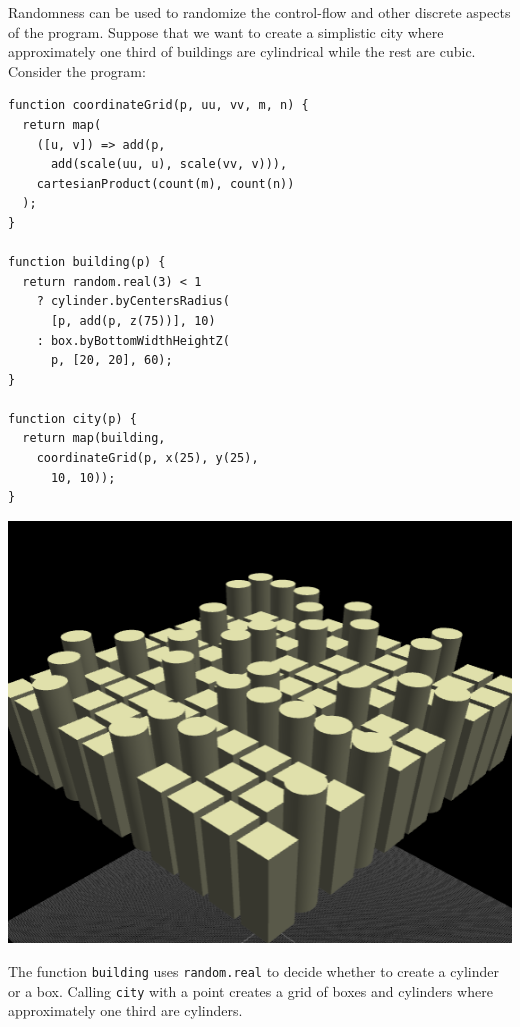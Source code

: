 Randomness can be used to randomize the control-flow and other discrete aspects of the program.
Suppose that we want to create a simplistic city where approximately one third of buildings are cylindrical while the rest are cubic.
Consider the program:

\noindent
\begin{minipage}{1.0\textwidth}
\begin{minipage}{0.5\textwidth}
\begin{verbatim}
function coordinateGrid(p, uu, vv, m, n) {
  return map(
    ([u, v]) => add(p,
      add(scale(uu, u), scale(vv, v))),
    cartesianProduct(count(m), count(n))
  );
}

function building(p) {
  return random.real(3) < 1
    ? cylinder.byCentersRadius(
      [p, add(p, z(75))], 10)
    : box.byBottomWidthHeightZ(
      p, [20, 20], 60);
}

function city(p) {
  return map(building,
    coordinateGrid(p, x(25), y(25),
      10, 10));
}
\end{verbatim}
\end{minipage}%
\begin{minipage}{0.5\textwidth}
  \includegraphics[width=1.0\textwidth]{./images/detail_examples/box_cyl_city_crop}
\end{minipage}
\end{minipage}

The function {\tt building} uses {\tt random.real} to decide whether to create a cylinder or a box.
Calling {\tt city} with a point creates a grid of boxes and cylinders where approximately one third are cylinders. %

